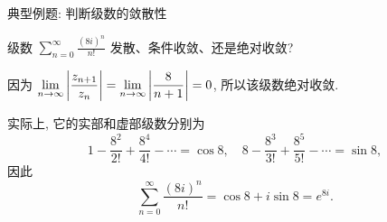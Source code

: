 \begin{frame}{典型例题: 判断级数的敛散性}
	\onslide<+->
	\begin{example}
		级数 $\displaystyle\sum_{n=0}^\infty\frac{(8i)^n}{n!}$ 发散、条件收敛、还是绝对收敛?
	\end{example}

	\onslide<+->
	\begin{solution}
		因为 $\displaystyle\lim_{n\to\infty}\left|\frac{z_{n+1}}{z_n}\right|=\lim_{n\to\infty}\left|\dfrac{8}{n+1}\right|=0$, 所以该级数绝对收敛.
	\end{solution}

	\onslide<+->
	实际上, 它的实部和虚部级数分别为
	\[1-\frac{8^2}{2!}+\frac{8^4}{4!}-\cdots=\cos 8,\quad
	8-\frac{8^3}{3!}+\frac{8^5}{5!}-\cdots=\sin 8,\]
	\onslide<+->
	因此
	\[\sum_{n=0}^\infty\frac{(8i)^n}{n!}=\cos 8+i\sin 8=e^{8i}.\]
\end{frame}


